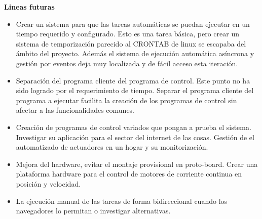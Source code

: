 \textbf{Lineas futuras}

\begin{itemize}
    \item Crear un sistema para que las tareas automáticas se puedan ejecutar en un tiempo requerido y configurado.
    Esto es una tarea básica, pero crear un sistema de temporización parecido al CRONTAB de linux se escapaba del ámbito del proyecto.
    Además el sistema de ejecución automática asíncrona y gestión por eventos deja muy localizada y de fácil acceso esta iteración.
    \item Separación del programa cliente del programa de control.
    Este punto no ha sido logrado por el requerimiento de tiempo.
    Separar el programa cliente del programa a ejecutar facilita la creación de los programas de control sin afectar a las funcionalidades comunes.
    \item Creación de programas de control variados que pongan a prueba el sistema.
    Investigar su aplicación para el sector del internet de las cosas.
    Gestión de el automatizado de actuadores en un hogar y su monitorización.
    \item Mejora del hardware, evitar el montaje provisional en proto-board.
    Crear una plataforma hardware para el control de motores de corriente continua en posición y velocidad.
    \item La ejecución manual de las tareas de forma bidireccional cuando los navegadores lo permitan o investigar alternativas.
\end{itemize}
